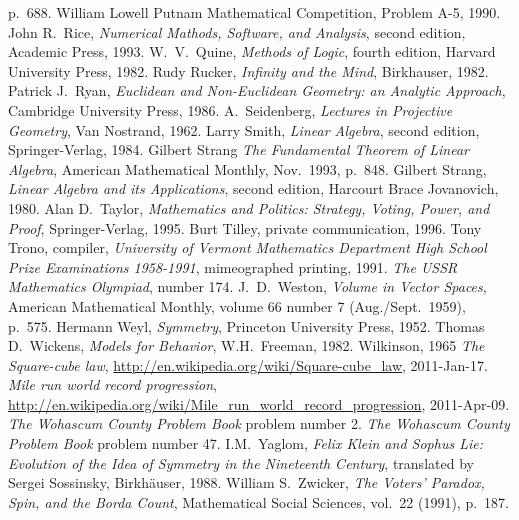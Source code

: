 \begin{thebibliography}{\makebox[2em][c]{{}\hfil{}}}
  p.~688.
  William Lowell Putnam Mathematical Competition,
  Problem A-5, 1990.
  John R.\ Rice,
  \emph{Numerical Mathods, Software, and Analysis},
  second edition,
  Academic Press,
  1993.
  W.\ V.\ Quine,
  \emph{Methods of Logic},
  fourth edition,
  Harvard University Press,
  1982.
  Rudy Rucker,
  \emph{Infinity and the Mind},
  Birkhauser,
  1982.
  Patrick J.~Ryan,
  \emph{Euclidean and Non-Euclidean Geometry: an Analytic Approach},
  Cambridge University Press, 1986.
  A.~Seidenberg,
  \emph{Lectures in Projective Geometry},
  Van Nostrand, 1962.
  Larry Smith,
  \emph{Linear Algebra},
  second edition,
  Springer-Verlag,
  1984.
  Gilbert Strang
  \emph{The Fundamental Theorem of Linear Algebra},
  American Mathematical Monthly,
  Nov.~1993, p.~848.
  Gilbert Strang,
  \emph{Linear Algebra and its Applications},
  second edition,
  Harcourt Brace Jovanovich,
  1980.
  Alan D.~Taylor,
  \emph{Mathematics and Politics: Strategy, Voting, Power, and Proof},
  Springer-Verlag,
  1995.
  Burt Tilley,
  private communication,
  1996.
  Tony Trono, compiler,
  \emph{University of Vermont Mathematics Department High School Prize
    Examinations 1958-1991},
  mimeographed printing, 1991.
  \emph{The USSR Mathematics Olympiad},
   number 174.
  J.~D.\ Weston,
  \emph{Volume in Vector Spaces},
  American Mathematical Monthly,
  volume 66 number 7 (Aug./Sept.\ 1959),
  p.~575.
  Hermann Weyl,
  \emph{Symmetry},
  Princeton University Press,
  1952.
  Thomas D.~Wickens,
  \emph{Models for Behavior},
  W.H.~Freeman,
  1982.
  Wilkinson,
  1965
  \emph{The Square-cube law},
  \url{http://en.wikipedia.org/wiki/Square-cube_law},
  2011-Jan-17.
  \emph{Mile run world record progression},
  \url{http://en.wikipedia.org/wiki/Mile_run_world_record_progression},
  2011-Apr-09.
  \emph{The Wohascum County Problem Book}
  problem number 2.
  \emph{The Wohascum County Problem Book}
  problem number 47.
  I.M.~Yaglom,
  \emph{Felix Klein and Sophus Lie: Evolution of the Idea of
   Symmetry in the Nineteenth Century},
  translated by Sergei Sossinsky,
  Birkh\"auser,
  1988.
  William S.~Zwicker,
  \emph{The Voters' Paradox, Spin, and the Borda Count},
  Mathematical Social Sciences,
  vol.~22 (1991),
  p.~187. 
\end{thebibliography}
